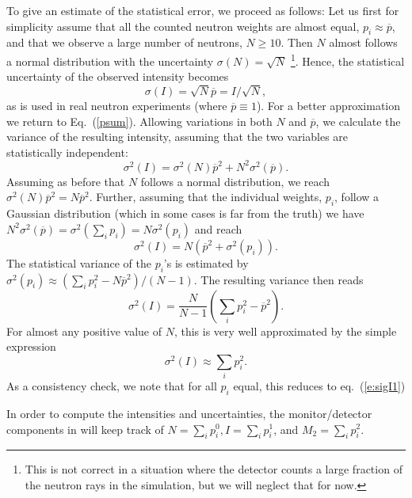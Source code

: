 To give an estimate of the statistical error, we proceed as follows:
Let us first for simplicity assume that all the counted neutron weights are
almost equal, $p_i \approx \overline{p}$,
and that we observe a large number of neutrons, $N \geq 10$.
Then $N$ almost follows a normal distribution
with the uncertainty $\sigma(N) = \sqrt{N}$
\footnote{This is not correct in a
situation where the detector counts a large fraction of the
neutron rays in the simulation, but we will neglect that for now.}.
Hence, the statistical uncertainty of the observed intensity becomes
\begin{equation} \label{e:sigI1}
 \sigma(I) = \sqrt{N} \overline{p} = I / \sqrt{N} ,
\end{equation}
as is used in real neutron experiments (where $\overline{p} \equiv 1$).
For a better approximation we return to Eq.~(\ref{psum}).
Allowing variations in both $N$ and $\overline{p}$,
we calculate the variance of the resulting intensity,
assuming that the two variables are statistically independent:
\begin{equation}
\sigma^2(I) = \sigma^2(N) \overline{p}^2 + N^2 \sigma^2(\overline{p}) .
\end{equation}
Assuming as before that $N$ follows a normal distribution, we reach
$\sigma^2(N) \overline{p}^2 = N \overline{p}^2$.
Further, assuming that the individual weights, $p_i$,
follow a Gaussian distribution (which in some cases is far from the truth)
we have
$N^2 \sigma^2(\overline{p}) = \sigma^2(\sum_i p_i) = N \sigma^2(p_i)$
and reach
\begin{equation}
\sigma^2(I) = N \left( \overline{p}^2 + \sigma^2(p_i) \right).
\end{equation}
The statistical variance of the $p_i$'s is estimated by
$\sigma^2(p_i) \approx  (\sum_i p_i^2 - N \overline{p}^2) / (N-1)$.
The resulting variance then reads
\begin{equation}
\sigma^2(I) = \frac{N}{N-1} \left( \sum_i p_i^2 - \overline{p}^2  \right) .
\end{equation}
For almost any positive value of $N$, this is very well approximated
by the simple expression
\begin{equation}
\sigma^2(I) \approx \sum_i p_i^2 .
\end{equation}
As a consistency check, we note that for all $p_i$ equal, this reduces to
eq.~(\ref{e:sigI1})

In order to compute the intensities and uncertainties, the monitor/detector components
in \MCS will keep track of
$N=\sum_i p_i^0, I=\sum_i p_i^1$, and $M_2 = \sum_i p_i^2$.


